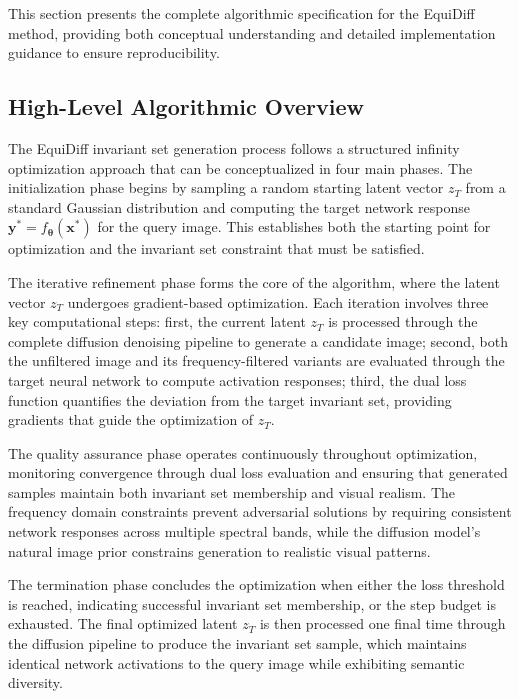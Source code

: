 This section presents the complete algorithmic specification for the EquiDiff method, providing both conceptual understanding and detailed implementation guidance to ensure reproducibility.

\subsection{High-Level Algorithmic Overview}

The EquiDiff invariant set generation process follows a structured infinity optimization approach that can be conceptualized in four main phases. The initialization phase begins by sampling a random starting latent vector $z_T$ from a standard Gaussian distribution and computing the target network response $\mathbf{y^*} = f_{\boldsymbol{\theta}}(\mathbf{x^*})$ for the query image. This establishes both the starting point for optimization and the invariant set constraint that must be satisfied.

The iterative refinement phase forms the core of the algorithm, where the latent vector $z_T$ undergoes gradient-based optimization. Each iteration involves three key computational steps: first, the current latent $z_T$ is processed through the complete diffusion denoising pipeline to generate a candidate image; second, both the unfiltered image and its frequency-filtered variants are evaluated through the target neural network to compute activation responses; third, the dual loss function quantifies the deviation from the target invariant set, providing gradients that guide the optimization of $z_T$.

The quality assurance phase operates continuously throughout optimization, monitoring convergence through dual loss evaluation and ensuring that generated samples maintain both invariant set membership and visual realism. The frequency domain constraints prevent adversarial solutions by requiring consistent network responses across multiple spectral bands, while the diffusion model's natural image prior constrains generation to realistic visual patterns.

The termination phase concludes the optimization when either the loss threshold is reached, indicating successful invariant set membership, or the step budget is exhausted. The final optimized latent $z_T$ is then processed one final time through the diffusion pipeline to produce the invariant set sample, which maintains identical network activations to the query image while exhibiting semantic diversity.

